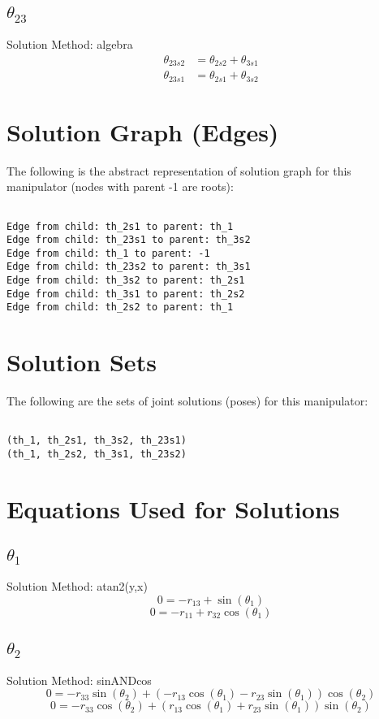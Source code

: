 \subsection{$\theta_{23}$ }
Solution Method:  algebra
\begin{align}
\theta_{23s2} &= \theta_{2s2} + \theta_{3s1} \\
\theta_{23s1} &= \theta_{2s1} + \theta_{3s2} 
\end{align}
\section{Solution Graph (Edges)}

    The following is the abstract representation of solution graph for this manipulator (nodes with parent -1 are roots):
    \begin{verbatim}
    
Edge from child: th_2s1 to parent: th_1
Edge from child: th_23s1 to parent: th_3s2
Edge from child: th_1 to parent: -1
Edge from child: th_23s2 to parent: th_3s1
Edge from child: th_3s2 to parent: th_2s1
Edge from child: th_3s1 to parent: th_2s2
Edge from child: th_2s2 to parent: th_1
\end{verbatim}
\section{Solution Sets}

    The following are the sets of joint solutions (poses) for this manipulator:
    \begin{verbatim}
    
(th_1, th_2s1, th_3s2, th_23s1)
(th_1, th_2s2, th_3s1, th_23s2)
\end{verbatim}
\section{Equations Used for Solutions}
\subsection{$\theta_{1}$ }
Solution Method:  atan2(y,x)
\begin{dmath}
0 = - r_{13} + \sin{\left (\theta_{1} \right )}
\end{dmath}
\begin{dmath}
0 = - r_{11} + r_{32} \cos{\left (\theta_{1} \right )}
\end{dmath}
\subsection{$\theta_{2}$ }
Solution Method:  sinANDcos
\begin{dmath}
0 = - r_{33} \sin{\left (\theta_{2} \right )} + \left(- r_{13} \cos{\left (\theta_{1} \right )} - r_{23} \sin{\left (\theta_{1} \right )}\right) \cos{\left (\theta_{2} \right )}
\end{dmath}
\begin{dmath}
0 = - r_{33} \cos{\left (\theta_{2} \right )} + \left(r_{13} \cos{\left (\theta_{1} \right )} + r_{23} \sin{\left (\theta_{1} \right )}\right) \sin{\left (\theta_{2} \right )}
\end{dmath}

